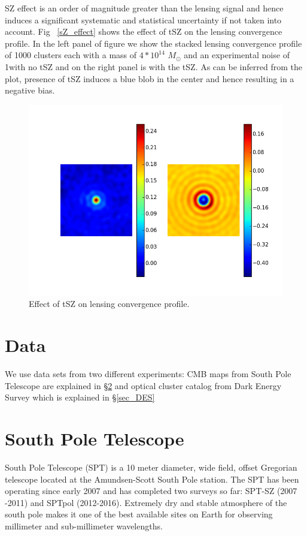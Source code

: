  
 SZ effect is an order of magnitude greater than the lensing signal and hence induces a significant systematic and statistical uncertainty if not taken into account. 
 Fig ~\ref{sZ_effect} shows the effect of tSZ on the lensing convergence profile. 
 In the left panel of figure we show the stacked lensing convergence profile of 1000 clusters each with a mass of $4*10^{14}$ $M_{\odot}$ and an experimental noise of 1\ukam with no tSZ and on the right panel is with the tSZ.  
 As can be inferred from the plot, presence of tSZ induces a blue blob in the center and hence resulting in a negative bias.
 \begin{figure}
\includegraphics[width=\linewidth]{figs/tSZ_effect_on_lensing.png}
\caption{Effect of tSZ on lensing convergence profile. }
\label{fig:SZ_effect}
\end{figure}



\section{Data}
\label{sec_data}
We use data sets from two different experiments: CMB maps from South Pole Telescope are explained in \S\ref{sec_SPT} and 
optical cluster catalog from Dark Energy Survey which is explained in \S\ref{sec_DES}

\section{South Pole Telescope}
\label{sec_SPT}
South Pole Telescope (SPT) is a 10 meter diameter, wide field, offset Gregorian telescope \citep[SPT,][]{padin08, carlstrom11} located at the Amundsen-Scott South Pole station.
The SPT has been operating since early 2007 and has completed two surveys so far: SPT-SZ (2007 -2011) and SPTpol (2012-2016).  
Extremely dry and stable atmosphere of the south pole makes it one of the best available sites on Earth for observing millimeter and sub-millimeter wavelengths. 

